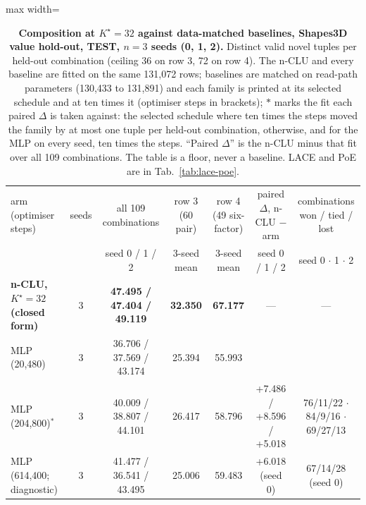 \documentclass{article} %
\newcommand{\Kstar}{\ensuremath{K^{\star}}}
\begin{document}
\begin{table}[t]
\centering\small
\caption{\textbf{Composition at $\Kstar=32$ against data-matched baselines, Shapes3D value hold-out, TEST, $n=3$
seeds (0, 1, 2).} Distinct valid novel tuples per held-out combination (ceiling 36 on row 3, 72 on row 4). The n-CLU %
and every baseline are fitted on the same 131,072 rows; baselines are matched on read-path parameters %
(130,433 to 131,891) and each family is printed at its selected schedule and at ten times it %
(optimiser steps in brackets); $\ast$ marks the fit each paired $\Delta$ is taken against: the
selected schedule where ten times the steps moved the family by at most one tuple per held-out combination,
otherwise, and for the MLP on every seed, ten times the steps. ``Paired $\Delta$'' is the n-CLU minus
that fit over all 109 combinations. The table is a floor, never a baseline. LACE and PoE are in %
Tab.~\ref{tab:lace-poe}.}
\label{tab:t7}
\setlength{\tabcolsep}{3pt}
\begin{adjustbox}{max width=\linewidth}\begin{tabular}{lcccccc}
\toprule
arm (optimiser steps) & seeds & all 109 combinations & row 3 (60 pair) & row 4 (49 six-factor) & paired $\Delta$, n-CLU $-$ arm & combinations won / tied / lost \\ %
 & & seed 0 / 1 / 2 & 3-seed mean & 3-seed mean & seed 0 / 1 / 2 & seed 0 $\cdot$ 1 $\cdot$ 2 \\
\midrule
\textbf{n-CLU, $\Kstar=32$ (closed form)} & 3 & \textbf{47.495 / 47.404 / 49.119} & \textbf{32.350} & \textbf{67.177} & --- & --- \\
MLP (20,480) & 3 & 36.706 / 37.569 / 43.174 & 25.394 & 55.993 & & \\
MLP (204,800)$^\ast$ & 3 & 40.009 / 38.807 / 44.101 & 26.417 & 58.796 & +7.486 / +8.596 / +5.018 & 76/11/22 $\cdot$ 84/9/16 $\cdot$ 69/27/13 \\
MLP (614,400; diagnostic) & 3 & 41.477 / 36.541 / 43.495 & 25.006 & 59.483 & +6.018 (seed 0) & 67/14/28 (seed 0) \\

\end{tabular}
\end{adjustbox}
\end{table}
\end{document}
